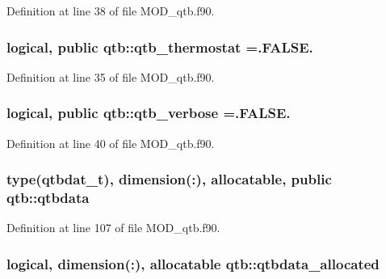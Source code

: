 Definition at line 38 of file M\-O\-D\-\_\-qtb.\-f90.

\hypertarget{classqtb_a9f30b1695ddee28edb2158790d43b14f}{
\subsubsection[{qtb\-\_\-thermostat}]{\setlength{\rightskip}{0pt plus 5cm}logical, public qtb\-::qtb\-\_\-thermostat =.F\-A\-L\-S\-E.}}\label{classqtb_a9f30b1695ddee28edb2158790d43b14f}


Definition at line 35 of file M\-O\-D\-\_\-qtb.\-f90.

\hypertarget{classqtb_a01848b620e9b24836a371122c84a71f2}{
\subsubsection[{qtb\-\_\-verbose}]{\setlength{\rightskip}{0pt plus 5cm}logical, public qtb\-::qtb\-\_\-verbose =.F\-A\-L\-S\-E.}}\label{classqtb_a01848b620e9b24836a371122c84a71f2}


Definition at line 40 of file M\-O\-D\-\_\-qtb.\-f90.

\hypertarget{classqtb_a29928faed9e005ea9609cd4c55f4ada8}{
\subsubsection[{qtbdata}]{\setlength{\rightskip}{0pt plus 5cm}type({\bf qtbdat\-\_\-t}), dimension(\-:), allocatable, public qtb\-::qtbdata}}\label{classqtb_a29928faed9e005ea9609cd4c55f4ada8}


Definition at line 107 of file M\-O\-D\-\_\-qtb.\-f90.

\hypertarget{classqtb_a6e5a1730bb8b5493f5205922093a3fdc}{
\subsubsection[{qtbdata\-\_\-allocated}]{\setlength{\rightskip}{0pt plus 5cm}logical, dimension(\-:), allocatable qtb\-::qtbdata\-\_\-allocated}}\label{classqtb_a6e5a1730bb8b5493f5205922093a3fdc}


